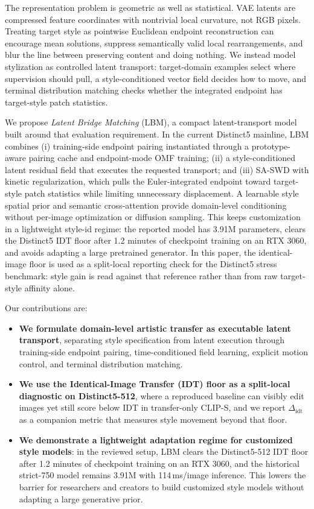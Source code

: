 \documentclass[letterpaper]{article}
\begin{document}
The representation problem is geometric as well as statistical. VAE latents are compressed feature coordinates with nontrivial local curvature, not RGB pixels. Treating target style as pointwise Euclidean endpoint reconstruction can encourage mean solutions, suppress semantically valid local rearrangements, and blur the line between preserving content and doing nothing. We instead model stylization as controlled latent transport: target-domain examples select where supervision should pull, a style-conditioned vector field decides how to move, and terminal distribution matching checks whether the integrated endpoint has target-style patch statistics.

We propose \emph{Latent Bridge Matching} (LBM), a compact latent-transport model built around that evaluation requirement. In the current Distinct5 mainline, LBM combines (i) training-side endpoint pairing instantiated through a prototype-aware pairing cache and endpoint-mode OMF training; (ii) a style-conditioned latent residual field that executes the requested transport; and (iii) SA-SWD with kinetic regularization, which pulls the Euler-integrated endpoint toward target-style patch statistics while limiting unnecessary displacement. A learnable style spatial prior and semantic cross-attention provide domain-level conditioning without per-image optimization or diffusion sampling. This keeps customization in a lightweight style-id regime: the reported model has 3.91M parameters, clears the Distinct5 IDT floor after 1.2 minutes of checkpoint training on an RTX 3060, and avoids adapting a large pretrained generator. In this paper, the identical-image floor is used as a split-local reporting check for the Distinct5 stress benchmark: style gain is read against that reference rather than from raw target-style affinity alone.

Our contributions are:
\begin{itemize}
    \item \textbf{We formulate domain-level artistic transfer as executable latent transport}, separating style specification from latent execution through training-side endpoint pairing, time-conditioned field learning, explicit motion control, and terminal distribution matching.
    \item \textbf{We use the Identical-Image Transfer (IDT) floor as a split-local diagnostic on Distinct5-512}, where a reproduced baseline can visibly edit images yet still score below IDT in transfer-only CLIP-S, and we report $\Delta_{\mathrm{idt}}$ as a companion metric that measures style movement beyond that floor.
    \item \textbf{We demonstrate a lightweight adaptation regime for customized style models}: in the reviewed setup, LBM clears the Distinct5-512 IDT floor after 1.2 minutes of checkpoint training on an RTX 3060, and the historical strict-750 model remains 3.91M with 114\,ms/image inference. This lowers the barrier for researchers and creators to build customized style models without adapting a large generative prior.
\end{itemize}
\end{document}

